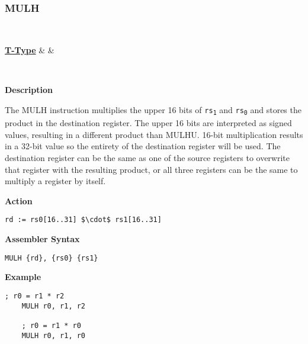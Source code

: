 \subsubsection{MULH }\label{sec:MULH}

\vspace{3ex}

\begin{center}
	\begin{bytefield}[leftcurly=., leftcurlyspace=0pt]{32}
		 \\
		\begin{leftwordgroup}{\hyperref[sec:t-type]{\textbf{T-Type}}}
		 & 
		 &
		\end{leftwordgroup}\\
	\end{bytefield}
\end{center}

\textbf{Description}

The MULH instruction multiplies the upper 16 bits of \texttt{rs\textsubscript{1}} and \texttt{rs\textsubscript{0}} and stores the product in the destination register.
The upper 16 bits are interpreted as signed values, resulting in a different product than MULHU.
16-bit multiplication results in a 32-bit value so the entirety of the destination register will be used.
The destination register can be the same as one of the source registers to overwrite that register with the resulting product,
or all three registers can be the same to multiply a register by itself.
\vspace{3ex}

\textbf{Action}
\begin{lstlisting}[frame=single]
	rd := rs0[16..31] $\cdot$ rs1[16..31]
\end{lstlisting}

\vspace{3ex}

\textbf{Assembler Syntax}
\begin{lstlisting}[frame=single]
	MULH {rd}, {rs0} {rs1}
\end{lstlisting}

\vspace{3ex}

\textbf{Example}
\begin{lstlisting}[frame=single]
	; r0 = r1 * r2
	MULH r0, r1, r2
	
	; r0 = r1 * r0
	MULH r0, r1, r0
\end{lstlisting} 


